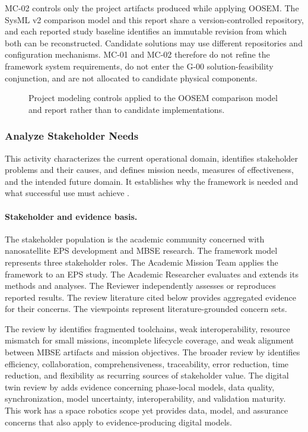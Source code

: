 \documentclass[11pt,a4paper]{article}
\begin{document}
MC-02 controls only the project artifacts produced while applying OOSEM. The SysML v2 comparison model and this report share a version-controlled repository, and each reported study baseline identifies an immutable revision from which both can be reconstructed. Candidate solutions may use different repositories and configuration mechanisms. MC-01 and MC-02 therefore do not refine the framework system requirements, do not enter the G-00 solution-feasibility conjunction, and are not allocated to candidate physical components.

\begin{figure}[H]
    \centering
    \resizebox{\linewidth}{!}{}
    \caption{Project modeling controls applied to the OOSEM comparison model and report rather than to candidate implementations.}
    \label{fig:project-modeling-controls}
\end{figure}

\subsubsection{Analyze Stakeholder Needs}
\label{subsubsection:analyze-stakeholder-needs}
This activity characterizes the current operational domain, identifies stakeholder problems and their causes, and defines mission needs, measures of effectiveness, and the intended future domain. It establishes why the framework is needed and what successful use must achieve \citep{friedenthal2014practical}.

\paragraph{Stakeholder and evidence basis.}
The stakeholder population is the academic community concerned with nanosatellite EPS development and MBSE research. The framework model represents three stakeholder roles. The Academic Mission Team applies the framework to an EPS study. The Academic Researcher evaluates and extends its methods and analyses. The Reviewer independently assesses or reproduces reported results. The review literature cited below provides aggregated evidence for their concerns. The viewpoints represent literature-grounded concern sets.

The review by \citet[Sec.~5.1 and Table~5]{buruso2026modelbased} identifies fragmented toolchains, weak interoperability, resource mismatch for small missions, incomplete lifecycle coverage, and weak alignment between MBSE artifacts and mission objectives. The broader review by \citet[Sec.~4.7 and Table~3]{vizitiu2025optimizing} identifies efficiency, collaboration, comprehensiveness, traceability, error reduction, time reduction, and flexibility as recurring sources of stakeholder value. The digital twin review by \citet[Secs.~8.4--8.6 and Tables~8--13]{rostamnia2026digitaltwin} adds evidence concerning phase-local models, data quality, synchronization, model uncertainty, interoperability, and validation maturity. This work has a space robotics scope yet provides data, model, and assurance concerns that also apply to evidence-producing digital models.
\end{document}
